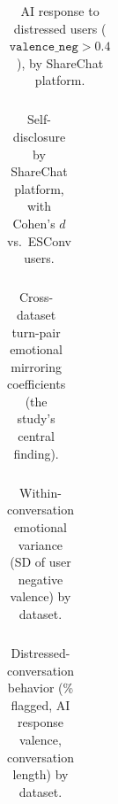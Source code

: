 \documentclass[11pt]{article}
\begin{document}
\begin{table}[htbp]
\centering
\caption{AI response to distressed users ($\texttt{valence\_neg} > 0.4$), by ShareChat platform.}
\label{tab:5}
\begin{tabular}{l}
\toprule
\bottomrule
\end{tabular}
\end{table}

\begin{table}[htbp]
\centering
\caption{Self-disclosure by ShareChat platform, with Cohen's $d$ vs.\ ESConv users.}
\label{tab:6}
\begin{tabular}{l}
\toprule
\bottomrule
\end{tabular}
\end{table}

\begin{table}[htbp]
\centering
\caption{Cross-dataset turn-pair emotional mirroring coefficients (the study's central finding).}
\label{tab:7}
\begin{tabular}{l}
\toprule
\bottomrule
\end{tabular}
\end{table}

\begin{table}[htbp]
\centering
\caption{Within-conversation emotional variance (SD of user negative valence) by dataset.}
\label{tab:8}
\begin{tabular}{l}
\toprule
\bottomrule
\end{tabular}
\end{table}

\begin{table}[htbp]
\centering
\caption{Distressed-conversation behavior (\% flagged, AI response valence, conversation length) by dataset.}
\label{tab:9}
\begin{tabular}{l}
\toprule
\bottomrule
\end{tabular}
\end{table}
\end{document}
